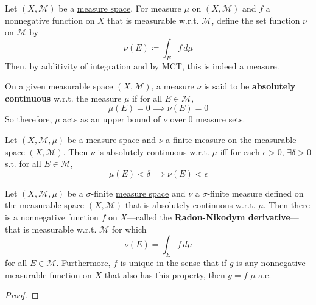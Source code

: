   Let $(X, \mathcal{M})$ be a \hyperref[def:measure-space]{measure space}. For measure $\mu$ on $(X, \mathcal{M})$ and $f$ a nonnegative function on $X$ that is measurable w.r.t. $\mathcal{M}$, define the set function $\nu$ on $\mathcal{M}$ by 
  \begin{equation}
    \nu(E) \coloneqq \int_E f \, d\mu
  \end{equation}
  Then, by additivity of integration and by MCT, this is indeed a measure. 

  \begin{definition}
    \label{def:absolutely-continuous-measures}
    On a given measurable space $(X, \mathcal{M})$, a measure $\nu$ is said to be \textbf{absolutely continuous} w.r.t. the measure $\mu$ if for all $E \in \mathcal{M}$, 
    \begin{equation}
      \mu(E) = 0 \implies \nu(E) = 0
    \end{equation}
    So therefore, $\mu$ acts as an upper bound of $\nu$ over $0$ measure sets. 
  \end{definition}

  \begin{theorem}
    \label{thm:lebesgue-decomposition-for-a-finite-measure}
    Let $(X, \mathcal{M}, \mu)$ be a \hyperref[def:measure-space]{measure space} and $\nu$ a finite measure on the measurable space $(X, \mathcal{M})$. Then $\nu$ is absolutely continuous w.r.t. $\mu$ iff for each $\epsilon > 0$, $\exists \delta > 0$ s.t. for all $E \in \mathcal{M}$, 
    \begin{equation}
      \mu(E) < \delta \implies \nu(E) < \epsilon 
    \end{equation}
  \end{theorem}

  \begin{theorem}
    \label{thm:rn-der}
    Let $(X, \mathcal{M}, \mu)$ be a $\sigma$-finite \hyperref[def:measure-space]{measure space} and $\nu$ a $\sigma$-finite measure defined on the measurable space $(X, \mathcal{M})$ that is absolutely continuous w.r.t. $\mu$. Then there is a nonnegative function $f$ on $X$---called the \textbf{Radon-Nikodym derivative}---that is measurable w.r.t. $\mathcal{M}$ for which 
    \begin{equation}
      \nu(E) = \int_E f \,d \mu
    \end{equation}
    for all $E \in \mathcal{M}$. Furthermore, $f$ is unique in the sense that if $g$ is any nonnegative \hyperref[def:measurable-function]{measurable function} on $X$ that also has this property, then $g = f$ $\mu$-a.e. 
  \end{theorem}
  \begin{proof}
    
  \end{proof}

